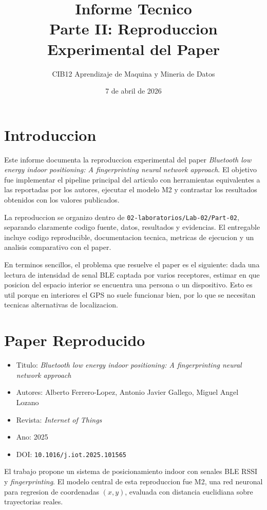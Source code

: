 \documentclass[11pt,a4paper]{article}
\title{Informe Tecnico\\Parte II: Reproduccion Experimental del Paper}
\author{CIB12 Aprendizaje de Maquina y Mineria de Datos}
\date{7 de abril de 2026}
\begin{document}
\maketitle

\section{Introduccion}
Este informe documenta la reproduccion experimental del paper \textit{Bluetooth low energy indoor positioning: A fingerprinting neural network approach}. El objetivo fue implementar el pipeline principal del articulo con herramientas equivalentes a las reportadas por los autores, ejecutar el modelo M2 y contrastar los resultados obtenidos con los valores publicados.

La reproduccion se organizo dentro de \texttt{02-laboratorios/Lab-02/Part-02}, separando claramente codigo fuente, datos, resultados y evidencias. El entregable incluye codigo reproducible, documentacion tecnica, metricas de ejecucion y un analisis comparativo con el paper.

En terminos sencillos, el problema que resuelve el paper es el siguiente: dada una lectura de intensidad de senal BLE captada por varios receptores, estimar en que posicion del espacio interior se encuentra una persona o un dispositivo. Esto es util porque en interiores el GPS no suele funcionar bien, por lo que se necesitan tecnicas alternativas de localizacion.

\section{Paper Reproducido}
\begin{itemize}
\item Titulo: \textit{Bluetooth low energy indoor positioning: A fingerprinting neural network approach}
\item Autores: Alberto Ferrero-Lopez, Antonio Javier Gallego, Miguel Angel Lozano
\item Revista: \textit{Internet of Things}
\item Ano: 2025
\item DOI: \texttt{10.1016/j.iot.2025.101565}
\end{itemize}

El trabajo propone un sistema de posicionamiento indoor con senales BLE RSSI y \textit{fingerprinting}. El modelo central de esta reproduccion fue M2, una red neuronal para regresion de coordenadas $(x,y)$, evaluada con distancia euclidiana sobre trayectorias reales.
\end{document}
